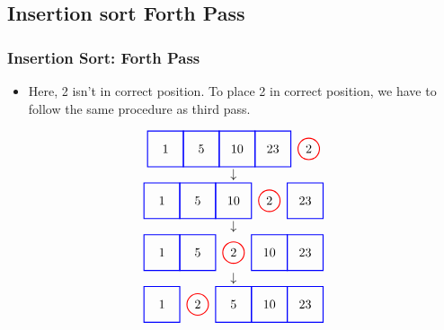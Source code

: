 \documentclass{beamer}
\begin{document}
\subsection{Insertion sort Forth Pass}
\begin{frame}[c, fragile]
\frametitle{Insertion Sort: Forth Pass}

\begin{itemize}
    \item Here, 2 isn't in correct position. To place 2 in correct position, we have to follow the same procedure as third pass.
\end{itemize}

\[
\begin{array}{c}
\begin{tikzpicture}[baseline=(current bounding box.center)]
    \node at (0,0) {1};
    \node at (1,0) {5};
    \node at (2,0) {10};
    \node at (3,0) {23};
    \node at (4,0) {2};
    \draw[red, thick] (4,0) circle (0.3);
    \draw[blue, thick] (-0.5,-0.5) rectangle (0.5,0.5);
    \draw[blue, thick] (0.5,-0.5) rectangle (1.5,0.5);
    \draw[blue, thick] (1.5,-0.5) rectangle (2.5,0.5);
    \draw[blue, thick] (2.5,-0.5) rectangle (3.5,0.5);
\end{tikzpicture} \\
\downarrow \\
\begin{tikzpicture}[baseline=(current bounding box.center)]
    \node at (0,0) {1};
    \node at (1,0) {5};
    \node at (2,0) {10};
    \node at (3,0) {2};
    \node at (4,0) {23};
    \draw[red, thick] (3,0) circle (0.3);
    \draw[blue, thick] (-0.5,-0.5) rectangle (0.5,0.5);
    \draw[blue, thick] (0.5,-0.5) rectangle (1.5,0.5);
    \draw[blue, thick] (1.5,-0.5) rectangle (2.5,0.5);
    \draw[blue, thick] (3.5,-0.5) rectangle (4.5,0.5);
\end{tikzpicture} \\
\downarrow \\
\begin{tikzpicture}[baseline=(current bounding box.center)]
    \node at (0,0) {1};
    \node at (1,0) {5};
    \node at (2,0) {2};
    \node at (3,0) {10};
    \node at (4,0) {23};
    \draw[red, thick] (2,0) circle (0.3);
    \draw[blue, thick] (-0.5,-0.5) rectangle (0.5,0.5);
    \draw[blue, thick] (0.5,-0.5) rectangle (1.5,0.5);
    \draw[blue, thick] (2.5,-0.5) rectangle (3.5,0.5);
    \draw[blue, thick] (3.5,-0.5) rectangle (4.5,0.5);
\end{tikzpicture} \\
\downarrow \\
\begin{tikzpicture}[baseline=(current bounding box.center)]
    \node at (0,0) {1};
    \node at (1,0) {2};
    \node at (2,0) {5};
    \node at (3,0) {10};
    \node at (4,0) {23};
    \draw[red, thick] (1,0) circle (0.3);
    \draw[blue, thick] (-0.5,-0.5) rectangle (0.5,0.5);
    \draw[blue, thick] (1.5,-0.5) rectangle (2.5,0.5);
    \draw[blue, thick] (2.5,-0.5) rectangle (3.5,0.5);
    \draw[blue, thick] (3.5,-0.5) rectangle (4.5,0.5);
\end{tikzpicture}
\end{array}
\]
\end{frame}
\end{document}
